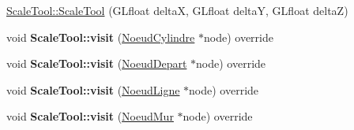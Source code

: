 \begin{DoxyCompactItemize}
\item 
\hyperlink{group__inf2990_ga87222e8bea8ff2b71862e5993d1a3669}{Scale\+Tool\+::\+Scale\+Tool} (G\+Lfloat delta\+X, G\+Lfloat delta\+Y, G\+Lfloat delta\+Z)
\item 
\hypertarget{group__inf2990_gab8949c8d5e040c10f62d385129a586f2}{}void {\bfseries Scale\+Tool\+::visit} (\hyperlink{class_noeud_cylindre}{Noeud\+Cylindre} $\ast$node) override\label{group__inf2990_gab8949c8d5e040c10f62d385129a586f2}

\item 
\hypertarget{group__inf2990_ga15d28436292d75172260ec68ae29807c}{}void {\bfseries Scale\+Tool\+::visit} (\hyperlink{class_noeud_depart}{Noeud\+Depart} $\ast$node) override\label{group__inf2990_ga15d28436292d75172260ec68ae29807c}

\item 
\hypertarget{group__inf2990_gae4653a11079d994f660974bff61c5c7b}{}void {\bfseries Scale\+Tool\+::visit} (\hyperlink{class_noeud_ligne}{Noeud\+Ligne} $\ast$node) override\label{group__inf2990_gae4653a11079d994f660974bff61c5c7b}

\item 
\hypertarget{group__inf2990_ga376afcceadc7462902ff0e3bad3573e9}{}void {\bfseries Scale\+Tool\+::visit} (\hyperlink{class_noeud_mur}{Noeud\+Mur} $\ast$node) override\label{group__inf2990_ga376afcceadc7462902ff0e3bad3573e9}


\end{DoxyCompactItemize}
